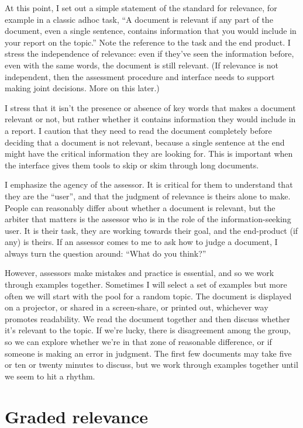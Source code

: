 \documentclass[nobib]{tufte-book}
\begin{document}
At this point, I set out a simple statement of the standard for relevance, for example in a classic adhoc task, ``A document is relevant if any part of the document, even a single sentence, contains information that you would include in your report on the topic.''  Note the reference to the task and the end product.  I stress the independence of relevance: even if they've seen the information before, even with the same words, the document is still relevant.  (If relevance is not independent, then the assessment procedure and interface needs to support making joint decisions.  More on this later.)

I stress that it isn't the presence or absence of key words that makes a document relevant or not, but rather whether it contains information they would include in a report.  I caution that they need to read the document completely before deciding that a document is not relevant, because a single sentence at the end might have the critical information they are looking for.  This is important when the interface gives them tools to skip or skim through long documents.

I emphasize the agency of the assessor.  It is critical for them to understand that they are the ``user'', and that the judgment of relevance is theirs alone to make.  People can reasonably differ about whether a document is relevant, but the arbiter that matters is the assessor who is in the role of the information-seeking user.  It is their task, they are working towards their goal, and the end-product (if any) is theirs.  If an assessor comes to me to ask how to judge a document, I always turn the question around: ``What do you think?''

However, assessors make mistakes and practice is essential, and so we work through examples together.  Sometimes I will select a set of examples but more often we will start with the pool for a random topic.  The document is displayed on a projector, or shared in a screen-share, or printed out, whichever way promotes readability.  We read the document together and then discuss whether it's relevant to the topic.  If we're lucky, there is disagreement among the group, so we can explore whether we're in that zone of reasonable difference, or if someone is making an error in judgment.  The first few documents may take five or ten or twenty minutes to discuss, but we work through examples together until we seem to hit a rhythm.

\section{Graded relevance}
\end{document}
